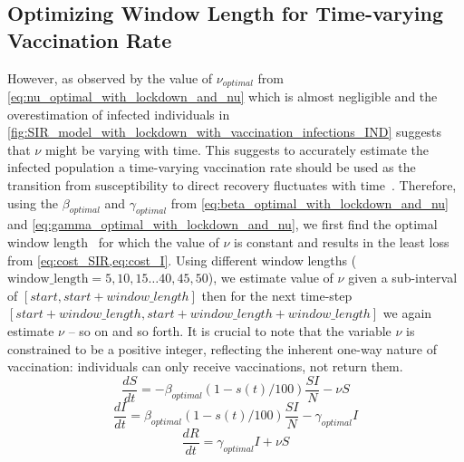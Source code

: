 \documentclass[tikz,fleqn,12pt]{wlscirep}
\begin{document}
\subsection{Optimizing Window Length for Time-varying Vaccination Rate}\label{optimizing_window_length}
However, as observed by the value of $\nu_{optimal}$ from \cref{eq:nu_optimal_with_lockdown_and_nu} which is almost negligible and the overestimation of infected individuals in \cref{fig:SIR_model_with_lockdown_with_vaccination_infections_IND} suggests that $\nu$ might be varying with time. This suggests to accurately estimate the infected population a time-varying vaccination rate should be used as the transition from susceptibility to direct recovery fluctuates with time~\cite{Liang2021,Marinov2022}. Therefore, using the $\beta_{optimal}$ and $\gamma_{optimal}$ from \cref{eq:beta_optimal_with_lockdown_and_nu} and \cref{eq:gamma_optimal_with_lockdown_and_nu}, we first find the optimal window length~\cite{Liao2020} for which the value of $\nu$ is constant and results in the least loss from \cref{eq:cost_SIR,eq:cost_I}. Using different window lengths ($\textrm{window\_length} = 5, 10, 15 \dots 40, 45, 50$), we estimate value of $\nu$ given a sub-interval of $[{start}, {start} + {window\_length}]$ then for the next time-step $[{start} + {window\_length}, {start} + {window\_length} + {window\_length}]$ we again estimate $\nu$ -- so on and so forth. It is crucial to note that the variable $\nu$ is constrained to be a positive integer, reflecting the inherent one-way nature of vaccination: individuals can only receive vaccinations, not return them.
\begin{equation}
  \frac{dS}{dt} = -\beta_{optimal}  (1 - s(t)/100)  \frac{S I}{N} - \nu S
  \label{eq:S_with_lockdown_and_nu_calc_nu}
\end{equation}
\begin{equation}
  \frac{dI}{dt} = \beta_{optimal}  (1 - s(t)/100) \frac{S I}{N} - \gamma_{optimal} I
  \label{eq:I_with_lockdown_and_nu_calc_nu}
\end{equation}
\begin{equation}
  \frac{dR}{dt} = \gamma_{optimal} I + \nu S
  \label{eq:R_with_lockdown_and_nu_calc_nu}
\end{equation}
\end{document}
